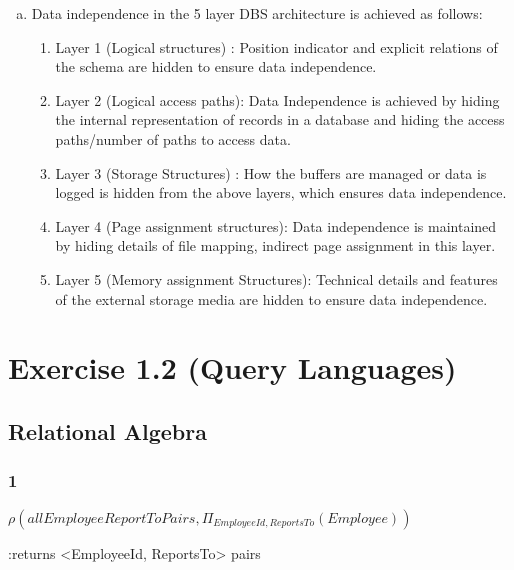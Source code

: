 \documentclass[10pt]{article}
\begin{document}
\begin{enumerate}[(a)]
		    \item Data independence in the 5 layer DBS architecture is achieved as follows:
		        \begin{enumerate}[(1)]
		                       \item Layer 1 (Logical structures) : Position indicator and explicit relations of the 							     schema are hidden to ensure data independence.
		            \item Layer 2 (Logical access paths): Data Independence is achieved by hiding the internal representation of 				   records in a database and hiding the access paths/number of paths to access data.
		            \item Layer 3 (Storage Structures) : How the buffers are managed or data is logged is hidden from the above 				layers, which ensures data independence.
		            \item Layer 4 (Page assignment structures): Data independence is maintained by hiding details of file 					mapping, indirect page assignment in this layer.
		            \item Layer 5 (Memory assignment Structures): Technical details and  features of the external storage media 				are hidden to ensure data independence.

		        \end{enumerate}
		\end{enumerate}
		
	\clearpage
		
	\section*{Exercise 1.2 (Query Languages)}
	
		\subsection*{Relational Algebra}
			\subsubsection*{1}
			
			
			$ \rho( allEmployeeReportToPairs, \Pi_{EmployeeId, ReportsTo}(Employee) ) $
			
			:returns <EmployeeId, ReportsTo> pairs \\
			
\end{document}
